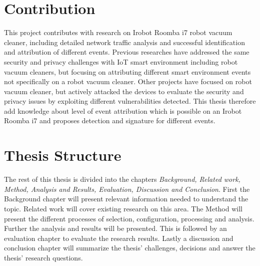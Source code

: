 \section{Contribution}
This project contributes with research on Irobot Roomba i7 robot vacuum cleaner, including detailed network traffic analysis and successful identification and attribution of different events. Previous researches have addressed the same security and privacy challenges with \gls{IoT} smart environment including robot vacuum cleaners, but focusing on attributing different smart environment events not specifically on a robot vacuum cleaner. Other projects have focused on robot vacuum cleaner, but actively attacked the devices to evaluate the security and privacy issues by exploiting different vulnerabilities detected. This thesis therefore add knowledge about level of event attribution which is possible on an Irobot Roomba i7 and proposes detection and signature for different events. 



\section{Thesis Structure}
The rest of this thesis is divided into the chapters \textit{Background, Related work, Method, Analysis and Results, Evaluation, Discussion and Conclusion}. First the Background chapter will present relevant information needed to understand the topic. Related work will cover existing research on this area. The Method will present the different processes of selection, configuration, processing and analysis. Further the analysis and results will be presented. This is followed by an evaluation chapter to evaluate the research results. Lastly a discussion and conclusion chapter will summarize the thesis' challenges, decisions and answer the thesis' research questions. 



